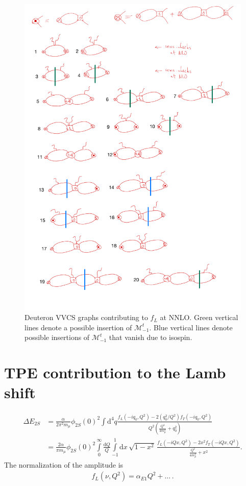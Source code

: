 \documentclass[prl,
twocolumn,
showpacs,preprintnumbers,amsmath,amssymb,
superscriptaddress,
a4paper,nofootinbib,longbibliography]{revtex4-2}
\begin{document}
\begin{figure}[htb]
\includegraphics[width=\textwidth]{figs/N2LO.pdf}
\caption{Deuteron VVCS graphs contributing to $f_L$ at NNLO. Green vertical lines denote a possible insertion of $\mathcal{M}_{-1}^{t}$. Blue vertical lines denote possible insertions of $\mathcal{M}_{-1}^{t}$ that vanish due to isospin.}
\end{figure}

\section{TPE contribution to the Lamb shift}

\begin{align}
\Delta E_{2S}&=
\frac{\alpha}{2\pi^2 m_\mu}\phi_{2S}(0)^2
\int \mathrm{d}^4 q
\frac{f_L(-iq_0,Q^2)-2(q_0^2/Q^2) f_T(-iq_0,Q^2)}{Q^2
\left(\frac{Q^4}{4m_\mu^2}+q_0^2\right)}\\
&=\frac{2\alpha}{\pi m_\mu}\phi_{2S}(0)^2
\int\limits_0^\infty\frac{\mathrm{d}Q}{Q}\int\limits_{-1}^{1} \mathrm{d}x\,\sqrt{1-x^2}\,
\frac{f_L(-iQx,Q^2)-2x^2 f_T(-iQx,Q^2)}{
\frac{Q^2}{4m_\mu^2}+x^2}.
\end{align}
The normalization of the amplitude is
\begin{align}
    f_L(\nu,Q^2) = \alpha_{E1}Q^2 +\dots\,.
\end{align}
\end{document}
